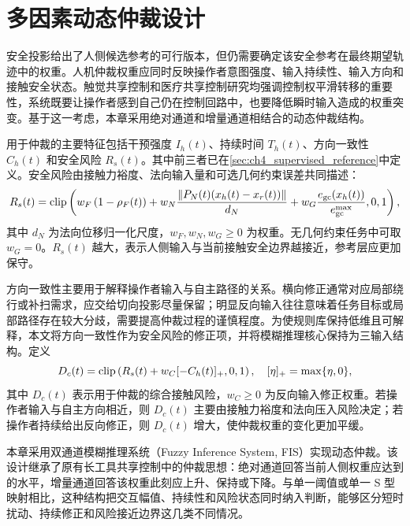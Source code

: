 \section{多因素动态仲裁设计}
\label{sec:ch4_dynamic_arbitration}

安全投影给出了人侧候选参考的可行版本，但仍需要确定该安全参考在最终期望轨迹中的权重。人机仲裁权重应同时反映操作者意图强度、输入持续性、输入方向和接触安全状态。触觉共享控制和医疗共享控制研究均强调控制权平滑转移的重要性，系统既要让操作者感到自己仍在控制回路中，也要降低瞬时输入造成的权重突变\cite{abbink2011hapticshared,su2022activityaware}。基于这一考虑，本章采用绝对通道和增量通道相结合的动态仲裁结构。

用于仲裁的主要特征包括干预强度 $I_h(t)$、持续时间 $T_h(t)$、方向一致性 $C_h(t)$ 和安全风险 $R_s(t)$。其中前三者已在\cref{sec:ch4_supervised_reference}中定义。安全风险由接触力裕度、法向输入量和可选几何约束误差共同描述：
\begin{equation}
  R_s(t)=
  \operatorname{clip}\left(
  w_F\left(1-\rho_F(t)\right)
  +w_N\frac{\left\lVert P_N(t)(x_h(t)-x_r(t))\right\rVert}{d_N}
  +w_G\frac{e_{\mathrm{gc}}(x_h(t))}{e_{\mathrm{gc}}^{\max}},
  0,1
  \right),
  \label{eq:ch4_safety_risk}
\end{equation}
其中 $d_N$ 为法向位移归一化尺度，$w_F,w_N,w_G\ge0$ 为权重。无几何约束任务中可取 $w_G=0$。$R_s(t)$ 越大，表示人侧输入与当前接触安全边界越接近，参考层应更加保守。

方向一致性主要用于解释操作者输入与自主路径的关系。横向修正通常对应局部绕行或补扫需求，应交给切向投影尽量保留；明显反向输入往往意味着任务目标或局部路径存在较大分歧，需要提高仲裁过程的谨慎程度。为使规则库保持低维且可解释，本文将方向一致性作为安全风险的修正项，并将模糊推理核心保持为三输入结构。定义
\begin{equation}
  D_c(t)=\operatorname{clip}\left(R_s(t)+w_C[-C_h(t)]_+,0,1\right),
  \quad [\eta]_+=\max\{\eta,0\},
  \label{eq:ch4_contact_risk_input}
\end{equation}
其中 $D_c(t)$ 表示用于仲裁的综合接触风险，$w_C\ge0$ 为反向输入修正权重。若操作者输入与自主方向相近，则 $D_c(t)$ 主要由接触力裕度和法向压入风险决定；若操作者持续给出反向修正，则 $D_c(t)$ 增大，使仲裁权重的变化更加平缓。

本章采用双通道模糊推理系统（Fuzzy Inference System, FIS）实现动态仲裁。该设计继承了原有长工具共享控制中的仲裁思想：绝对通道回答当前人侧权重应达到的水平，增量通道回答该权重此刻应上升、保持或下降。与单一阈值或单一 S 型映射相比，这种结构把交互幅值、持续性和风险状态同时纳入判断，能够区分短时扰动、持续修正和风险接近边界这几类不同情况。

